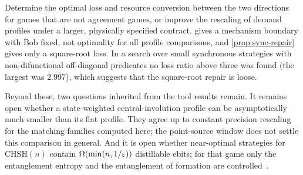 \begin{problem}\label{prob:direction}
Determine the optimal loss and resource conversion between the two directions for games that are not agreement games, or improve
the rescaling of demand profiles under a larger, physically specified contract.  gives a mechanism
boundary with Bob fixed, not optimality for all profile comparisons, and \cref{prop:sync-repair} gives only a square-root loss. In a
search over small synchronous strategies with non-difunctional off-diagonal predicates no loss ratio above three was found (the
largest was $2.997$), which suggests that the square-root repair is loose.
\end{problem}

Beyond these, two questions inherited from the tool results remain. It remains open whether a state-weighted central-involution
profile can be asymptotically much smaller than its flat profile. They agree up to constant precision rescaling for the matching
families computed here; the point-source window does not settle this comparison in general. And it is open whether near-optimal
strategies for $\mathrm{CHSH}(n)$ contain $\Omega(\min(n,1/\varepsilon))$ distillable ebits; for that game only the entanglement entropy and
the entanglement of formation are controlled~\cite[Theorem~E]{DM-game}.
